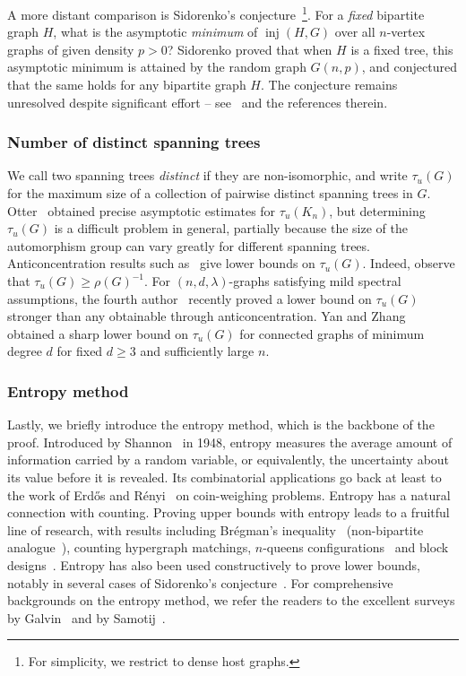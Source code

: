 \documentclass[10pt,a4paper]{amsart}
\numberwithin{equation}{section}
\theoremstyle{definition}
\theoremstyle{remark}
\DeclareMathOperator{\inj}{inj}
\begin{document}
A more distant comparison is Sidorenko's conjecture~\cite{sidorenko1991inequalities}\footnote{For simplicity, we restrict to dense host graphs.}. For a \textit{fixed} bipartite graph $H$, what is the asymptotic \textit{minimum} of $\inj(H, G)$ over all $n$-vertex graphs of given density $p>0$? Sidorenko proved that when $H$ is a fixed tree, this asymptotic minimum is attained by the random graph $G(n,p)$, and conjectured that the same holds for any bipartite graph $H$. The conjecture remains unresolved despite significant effort -- see~\cite{conlon18-sidorenko,szegedy14} and the references therein.

\subsubsection{Number of distinct spanning trees}
We call two spanning trees \emph{distinct} if they are non-isomorphic, and write $\tau_u(G)$ for the maximum size of a collection of pairwise distinct spanning trees in $G$.
Otter~\cite{Otter} obtained precise asymptotic estimates for $\tau_u(K_n)$, but determining $\tau_u(G)$ is a difficult problem in general, partially because the size of the automorphism group can vary greatly for different spanning trees.
Anticoncentration results such as~ give lower bounds on $\tau_u(G)$. Indeed, observe that $\tau_u(G)\geq \rho(G)^{-1}$.
For $(n,d,\lambda)$-graphs satisfying mild spectral assumptions, the fourth author~\cite{Wang} recently proved a lower bound on $\tau_u(G)$ stronger than any obtainable through anticoncentration. Yan and Zhang~\cite{Yan-Zhang} obtained a sharp lower bound on $\tau_u(G)$ for connected graphs of minimum degree $d$ for fixed $d\geq 3$ and sufficiently large $n$.

\subsubsection{Entropy method}
Lastly, we briefly introduce the entropy method, which is the backbone of the proof.
Introduced by Shannon~\cite{Shannon1948} in 1948, entropy measures the average amount of information carried by a random variable, or equivalently, the uncertainty about its value before it is revealed. Its combinatorial applications go back at least to the work of Erd\H{o}s and R\'enyi~\cite{ErdosRenyi1963} on coin-weighing problems. 
Entropy has a natural connection with counting. Proving upper bounds with entropy leads to a fruitful line of research, with results including 
Br\'egman's inequality~\cite{Radhakrishnan1997} (non-bipartite analogue~\cite{cutler2011entropy}), counting hypergraph matchings, $n$-queens configurations~\cite{Luria-n-queens, Simkin-n-queen} and block designs~\cite{Linial-Luria-STS,keevash2018counting}. Entropy has also been used constructively to prove lower bounds, notably in several cases of Sidorenko's conjecture~\cite{szegedy14}.
For comprehensive backgrounds on the entropy method, we refer the readers to the excellent surveys by Galvin~\cite{GalvinEntropy} and by  Samotij~\cite{SamotijEntropy}.
\end{document}
